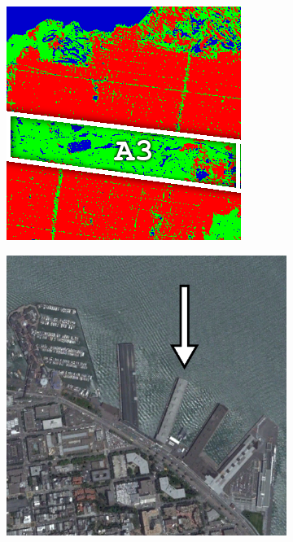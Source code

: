 \begin{figure}[!b]
\begin{subfigure}[t]{0.19\textwidth}
\includegraphics[width=\columnwidth]{Figures/ALOS2_SF_3Class/Sunset}
\caption{}
\label{fig:cla2_e}
\end{subfigure}
\begin{subfigure}[t]{0.19\textwidth}
\includegraphics[width=\columnwidth]{Figures/ALOS2_SF_3Class/JettyIm} 

\end{subfigure}
\end{figure}
